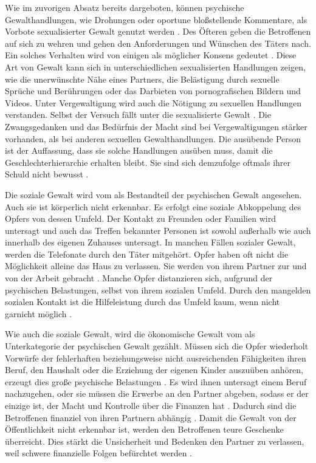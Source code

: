 Wie im zuvorigen Absatz bereits dargeboten, können psychische Gewalthandlungen, wie Drohungen oder oportune bloßstellende Kommentare, als Vorbote sexualisierter Gewalt genutzt werden \parencite{Übergang_psy_zu_sex_Gewalt}. Des Öfteren geben die Betroffenen auf sich zu wehren und gehen den Anforderungen und Wünschen des Täters nach. Ein solches Verhalten wird von einigen als möglicher Konsens gedeutet \parencite{Def_haus_Gewalt_2}. Diese Art von Gewalt kann sich in unterschiedlichen sexualisierten Handlungen zeigen, wie die unerwünschte Nähe eines Partners, die Belästigung durch sexuelle Sprüche und Berührungen oder das Darbieten von pornografischen Bildern und Videos. Unter Vergewaltigung wird auch die Nötigung zu sexuellen Handlungen verstanden. Selbst der Versuch fällt unter die sexualisierte Gewalt \parencite{Def_haus_Gewalt_2, Gewaltart, Def_Form_Folge_Gewalt}. Die Zwangsgedanken und das Bedürfnis der Macht sind bei Vergewaltigungen stärker vorhanden, als bei anderen sexuellen Gewalthandlungen. Die ausübende Person ist der Auffassung, dass sie solche Handlungen ausüben muss, damit die Geschlechterhierarchie erhalten bleibt. Sie sind sich demzufolge oftmals ihrer Schuld nicht bewusst \parencite{Def_haus_Gewalt_2}.

Die soziale Gewalt wird vom \textcite{Def_Form_Folge_Gewalt} als Bestandteil der psychischen Gewalt angesehen. Auch sie ist körperlich nicht erkennbar. Es erfolgt eine soziale Abkoppelung des Opfers von dessen Umfeld. Der Kontakt zu Freunden oder Familien wird untersagt und auch das Treffen bekannter Personen ist sowohl außerhalb wie auch innerhalb des eigenen Zuhauses untersagt. In manchen Fällen sozialer Gewalt, werden die Telefonate durch den Täter mitgehört. Opfer haben oft nicht die Möglichkeit alleine das Haus zu verlassen. Sie werden von ihrem Partner zur und von der Arbeit gebracht \parencite{Def_haus_Gewalt_2, Def_Form_Folge_Gewalt}. Manche Opfer distanzieren sich, aufgrund der psychischen Belastungen, selbst von ihrem sozialen Umfeld. Durch den mangelden sozialen Kontakt ist die Hilfeleistung durch das Umfeld kaum, wenn nicht garnicht möglich \parencite{Def_haus_Gewalt_2}.

Wie auch die soziale Gewalt, wird die ökonomische Gewalt vom \textcite{Def_Form_Folge_Gewalt} als Unterkategorie der psychischen Gewalt gezählt. Müssen sich die Opfer wiederholt Vorwürfe der fehlerhaften beziehungsweise nicht ausreichenden Fähigkeiten ihren Beruf, den Haushalt oder die Erziehung der eigenen Kinder auszuüben anhören, erzeugt dies große psychische Belastungen \parencite{Def_haus_Gewalt_2}. Es wird ihnen untersagt einem Beruf nachzugehen, oder sie müssen die Erwerbe an den Partner abgeben, sodass er der einzige ist, der Macht und Kontrolle über die Finanzen hat \parencite{Def_haus_Gewalt_2, Def_Form_Folge_Gewalt}. Dadurch sind die Betroffenen finanziel von ihren Partnern abhängig \parencite{physische_Gewalt_wie_aggro}. Damit die Gewalt von der Öffentlichkeit nicht erkennbar ist, werden den Betroffenen teure Geschenke überreicht. Dies stärkt die Unsicherheit und Bedenken den Partner zu verlassen, weil schwere finanzielle Folgen befürchtet werden \parencite{Übergang_psy_zu_sex_Gewalt}.

